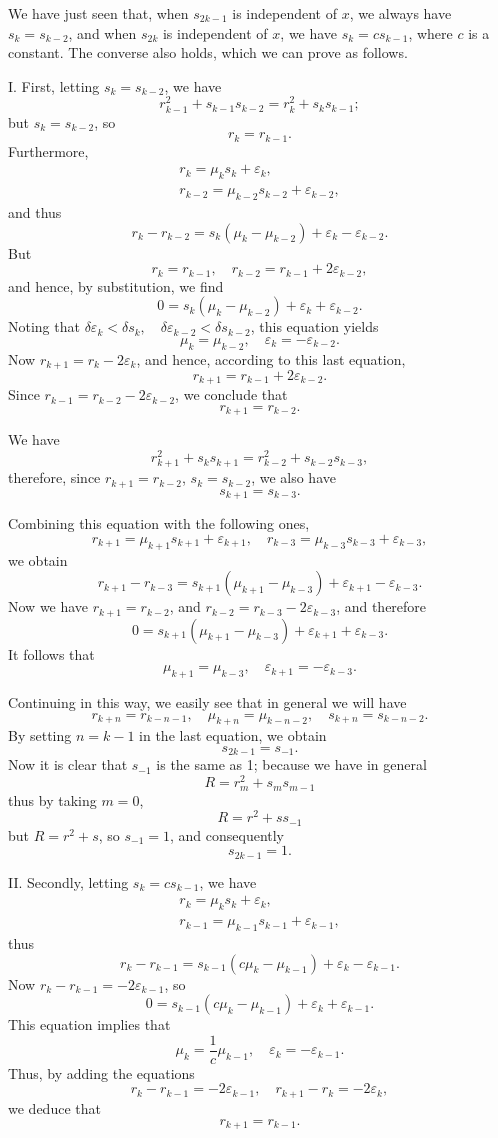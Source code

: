 \documentclass[oneside, 12 pt, leqno]{memoir}
\begin{document}
We have just seen that, when \(s_{2 k-1}\) is independent of \(x\), we always have \(s_k=s_{k-2}\), and when \(s_{2 k}\) is independent of \(x\), we have \(s_k=c s_{k-1}\), where \(c\) is a constant. The converse also holds, which we can prove as follows.

I. First, letting \(s_k=s_{k-2}\), we have
\[r_{k-1}^2+s_{k-1} s_{k-2}=r_k^2+s_k s_{k-1};\]
but \(s_k=s_{k-2}\), so
\[r_k=r_{k-1}.\]
Furthermore,
\[\begin{gathered}
r_k=\mu_k s_k+\varepsilon_k, \\
r_{k-2}=\mu_{k-2} s_{k-2}+\varepsilon_{k-2},
\end{gathered}\]
and thus
\[r_k-r_{k-2}=s_k\left(\mu_k-\mu_{k-2}\right)+\varepsilon_k-\varepsilon_{k-2}.\]
But
\[r_k=r_{k-1}, \quad r_{k-2}=r_{k-1}+2 \varepsilon_{k-2},\]
and hence, by substitution, we find
\[0=s_k\left(\mu_k-\mu_{k-2}\right)+\varepsilon_k+\varepsilon_{k-2}.\]
Noting that \(\delta \varepsilon_k<\delta s_k, \quad \delta \varepsilon_{k-2}<\delta s_{k-2}\), this equation yields
\[\mu_k=\mu_{k-2}, \quad \varepsilon_k=-\varepsilon_{k-2}.\]
Now \(r_{k+1}=r_k-2 \varepsilon_k\), and hence, according to this last equation,
\[r_{k+1}=r_{k-1}+2 \varepsilon_{k-2}.\]
Since \(r_{k-1}=r_{k-2}-2 \varepsilon_{k-2}\), we conclude that
\[r_{k+1}=r_{k-2}.\]

We have
\[r_{k+1}^2+s_k s_{k+1}=r_{k-2}^2+s_{k-2} s_{k-3},\]
therefore, since \(r_{k+1}=r_{k-2}\), \(s_k=s_{k-2}\), we also have
\[s_{k+1}=s_{k-3}.\]

Combining this equation with the following ones,
\[r_{k+1}=\mu_{k+1} s_{k+1}+\varepsilon_{k+1}, \quad r_{k-3}=\mu_{k-3} s_{k-3}+\varepsilon_{k-3},\]
we obtain
\[r_{k+1}-r_{k-3}=s_{k+1}\left(\mu_{k+1}-\mu_{k-3}\right)+\varepsilon_{k+1}-\varepsilon_{k-3}.\]
Now we have \(r_{k+1}=r_{k-2}\), and \(r_{k-2}=r_{k-3}-2 \varepsilon_{k-3}\), and therefore
\[0=s_{k+1}\left(\mu_{k+1}-\mu_{k-3}\right)+\varepsilon_{k+1}+\varepsilon_{k-3}.\]
It follows that
\[\mu_{k+1}=\mu_{k-3}, \quad \varepsilon_{k+1}=-\varepsilon_{k-3}.\]

Continuing in this way, we easily see that in general we will have
\[r_{k+n}=r_{k-n-1}, \quad \mu_{k+n}={\mu}_{k-n-2}, \quad s_{k+n}=s_{k-n-2}.\]
By setting \(n=k-1\) in the last equation, we obtain
\[s_{2 k-1}=s_{-1}.\]
Now it is clear that \(s_{-1}\) is the same as 1; because we have in general
\[R=r_m^2+s_m s_{m-1}\]
thus by taking \(m=0\),
\[R=r^2+s s_{-1}\]
but \(R=r^2+s\), so \(s_{-1}=1\), and consequently
\[s_{2 k-1}=1.\]

II. Secondly, letting \(s_k=c s_{k-1}\), we have
\[\begin{gathered}
r_k=\mu_k s_k+\varepsilon_k, \\
r_{k-1}=\mu_{k-1} s_{k-1}+\varepsilon_{k-1},
\end{gathered}\]
thus
\[r_k-r_{k-1}=s_{k-1}\left(c \mu_k-\mu_{k-1}\right)+\varepsilon_k-\varepsilon_{k-1}.\]
Now \(r_k-r_{k-1}=-2 \varepsilon_{k-1}\), so
\[0=s_{k-1}\left(c \mu_k-\mu_{k-1}\right)+\varepsilon_k+\varepsilon_{k-1}.\]
This equation implies that
\[\mu_k=\frac{1}{c} \mu_{k-1}, \quad \varepsilon_k=-\varepsilon_{k-1}.\]
Thus, by adding the equations
\[r_k-r_{k-1}=-2 \varepsilon_{k-1}, \quad r_{k+1}-r_k=-2 \varepsilon_k,\]
we deduce that
\[r_{k+1}=r_{k-1}.\]
\end{document}

